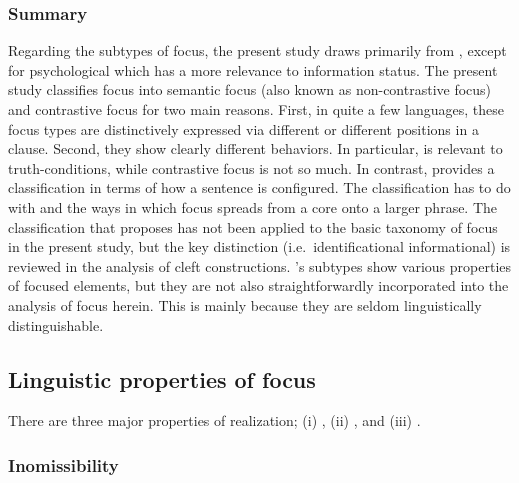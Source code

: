 \subsubsection{Summary}
\label{3:sssec:focus-sub-sum}

Regarding the subtypes of focus, the present study draws primarily
from \citet{gundel:99}, except for psychological  which has
a more relevance to information status.  The present study classifies
focus into semantic focus (also known as non-contrastive
focus) and contrastive focus for two main
reasons.  First, in quite a few languages, these focus types are
distinctively expressed via different  or
different positions in a clause. Second, they show clearly different
behaviors. In particular,  is
relevant to truth-conditions, while contrastive focus is not so much. In contrast, \citet{lambrecht:96} provides a
classification in terms of how a sentence is configured. The
classification has to do with  and the ways in
which focus spreads from a core onto a larger phrase. The
classification that \citet{kiss:98} proposes has not been applied to
the basic taxonomy of focus in the present study, but the key
distinction (i.e.\ identificational \vs informational) is reviewed in
the analysis of cleft constructions.
\citeauthor{gussenhoven:07}'s subtypes show various properties of focused
elements, but they are not also straightforwardly incorporated into
the analysis of focus herein. This is mainly because they are seldom
linguistically distinguishable.


\subsection{Linguistic properties of focus}
\label{3:ssec:properties-focus}

There are three major properties of  realization; (i)
, (ii) , and (iii)
.

\subsubsection{Inomissibility}
\label{3:sssec:inomissibility}




